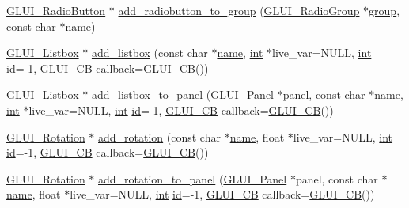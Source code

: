 \begin{DoxyCompactItemize}
\item 
\hyperlink{class_g_l_u_i___radio_button}{G\+L\+U\+I\+\_\+\+Radio\+Button} $\ast$ \hyperlink{class_g_l_u_i_a7744834cfb1a489e1c4ef8de9fef0efa}{add\+\_\+radiobutton\+\_\+to\+\_\+group} (\hyperlink{class_g_l_u_i___radio_group}{G\+L\+U\+I\+\_\+\+Radio\+Group} $\ast$\hyperlink{glext_8h_a69cec9b28d037f2272131b4fcd148620}{group}, const char $\ast$\hyperlink{glext_8h_ad977737dfc9a274a62741b9500c49a32}{name})
\item 
\hyperlink{class_g_l_u_i___listbox}{G\+L\+U\+I\+\_\+\+Listbox} $\ast$ \hyperlink{class_g_l_u_i_ad018fa077accdc1eac92b470df84b6ba}{add\+\_\+listbox} (const char $\ast$\hyperlink{glext_8h_ad977737dfc9a274a62741b9500c49a32}{name}, \hyperlink{wglext_8h_a500a82aecba06f4550f6849b8099ca21}{int} $\ast$live\+\_\+var=N\+U\+L\+L, \hyperlink{wglext_8h_a500a82aecba06f4550f6849b8099ca21}{int} \hyperlink{glext_8h_a58c2a664503e14ffb8f21012aabff3e9}{id}=-\/1, \hyperlink{class_g_l_u_i___c_b}{G\+L\+U\+I\+\_\+\+C\+B} callback=\hyperlink{class_g_l_u_i___c_b}{G\+L\+U\+I\+\_\+\+C\+B}())
\item 
\hyperlink{class_g_l_u_i___listbox}{G\+L\+U\+I\+\_\+\+Listbox} $\ast$ \hyperlink{class_g_l_u_i_af0254ec412cac9d379343e652f671799}{add\+\_\+listbox\+\_\+to\+\_\+panel} (\hyperlink{class_g_l_u_i___panel}{G\+L\+U\+I\+\_\+\+Panel} $\ast$panel, const char $\ast$\hyperlink{glext_8h_ad977737dfc9a274a62741b9500c49a32}{name}, \hyperlink{wglext_8h_a500a82aecba06f4550f6849b8099ca21}{int} $\ast$live\+\_\+var=N\+U\+L\+L, \hyperlink{wglext_8h_a500a82aecba06f4550f6849b8099ca21}{int} \hyperlink{glext_8h_a58c2a664503e14ffb8f21012aabff3e9}{id}=-\/1, \hyperlink{class_g_l_u_i___c_b}{G\+L\+U\+I\+\_\+\+C\+B} callback=\hyperlink{class_g_l_u_i___c_b}{G\+L\+U\+I\+\_\+\+C\+B}())
\item 
\hyperlink{class_g_l_u_i___rotation}{G\+L\+U\+I\+\_\+\+Rotation} $\ast$ \hyperlink{class_g_l_u_i_a96888da63ec5600e7b962e98066e89eb}{add\+\_\+rotation} (const char $\ast$\hyperlink{glext_8h_ad977737dfc9a274a62741b9500c49a32}{name}, float $\ast$live\+\_\+var=N\+U\+L\+L, \hyperlink{wglext_8h_a500a82aecba06f4550f6849b8099ca21}{int} \hyperlink{glext_8h_a58c2a664503e14ffb8f21012aabff3e9}{id}=-\/1, \hyperlink{class_g_l_u_i___c_b}{G\+L\+U\+I\+\_\+\+C\+B} callback=\hyperlink{class_g_l_u_i___c_b}{G\+L\+U\+I\+\_\+\+C\+B}())
\item 
\hyperlink{class_g_l_u_i___rotation}{G\+L\+U\+I\+\_\+\+Rotation} $\ast$ \hyperlink{class_g_l_u_i_ace8fb93ba123c09dcb5d0bbe721f02de}{add\+\_\+rotation\+\_\+to\+\_\+panel} (\hyperlink{class_g_l_u_i___panel}{G\+L\+U\+I\+\_\+\+Panel} $\ast$panel, const char $\ast$\hyperlink{glext_8h_ad977737dfc9a274a62741b9500c49a32}{name}, float $\ast$live\+\_\+var=N\+U\+L\+L, \hyperlink{wglext_8h_a500a82aecba06f4550f6849b8099ca21}{int} \hyperlink{glext_8h_a58c2a664503e14ffb8f21012aabff3e9}{id}=-\/1, \hyperlink{class_g_l_u_i___c_b}{G\+L\+U\+I\+\_\+\+C\+B} callback=\hyperlink{class_g_l_u_i___c_b}{G\+L\+U\+I\+\_\+\+C\+B}())

\end{DoxyCompactItemize}
